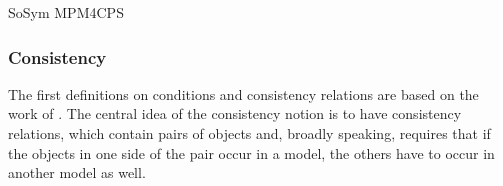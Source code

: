 \begin{copiedFrom}{SoSym MPM4CPS}





\subsubsection{Consistency}

The first definitions on conditions and consistency relations are based on the work of \textcite[sec. 2.3.2, 4.1.1]{kramer2017a}.
The central idea of the consistency notion is to have consistency relations, which contain pairs of objects and, broadly speaking, requires that if the objects in one side of the pair occur in a model, the others have to occur in another model as well.


\end{copiedFrom}
